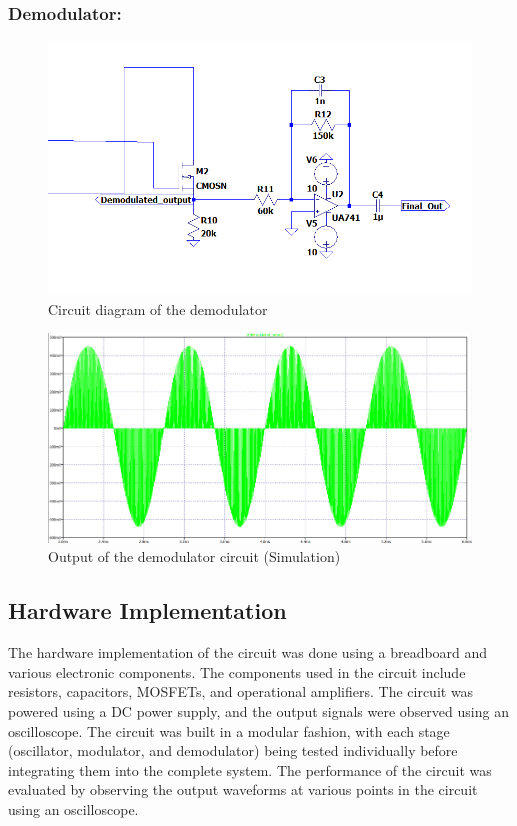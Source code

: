 \documentclass[conference]{IEEEtran}
\begin{document}
\subsubsection{Demodulator:}
\begin{figure}
    \centering
    \includegraphics[width=1\linewidth]{Images/Demodulator_ltspice.png}
    \caption{Circuit diagram of the demodulator}
\end{figure}

\begin{figure}
    \centering
    \includegraphics[width=1\linewidth]{Images/demodulated_output_ltspice.png}
    \caption{Output of the demodulator circuit (Simulation)}
\end{figure}


\subsection{Hardware Implementation}
The hardware implementation of the circuit was done using a breadboard and various electronic components. The components used in the circuit include resistors, capacitors, MOSFETs, and operational amplifiers. The circuit was powered using a DC power supply, and the output signals were observed using an oscilloscope.
The circuit was built in a modular fashion, with each stage (oscillator, modulator, and demodulator) being tested individually before integrating them into the complete system. The performance of the circuit was evaluated by observing the output waveforms at various points in the circuit using an oscilloscope.
\end{document}
